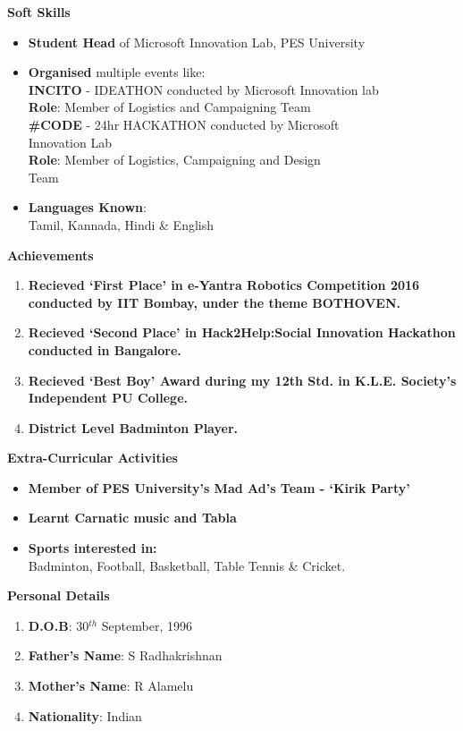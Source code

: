 \documentclass[a4paper,12pt,final]{memoir}
\newcommand{\Sep}{\vspace{1.5em}}
\newcommand{\SmallSep}{\vspace{0.5em}}
\newcommand\tab[1][1cm]{\hspace*{#1}}
\newcommand{\CVSection}[1]
{\Large\textbf{#1}\par
	\SmallSep\normalsize\normalfont}
\begin{document}
	\CVSection{Soft Skills}
		\begin{itemize}
			\item \textbf{Student Head} of Microsoft Innovation Lab, PES University
			\item \textbf{Organised} multiple events like:\\
			\tab \textbf{INCITO} - IDEATHON conducted by Microsoft Innovation lab\\
			\tab \tab \textbf{Role}: Member of Logistics and Campaigning Team\\
			\clearpage
			\framebreak
			\framebreak
			\tab \textbf{\#CODE} - 24hr HACKATHON conducted by Microsoft \\\tab \tab Innovation Lab\\
			\tab \tab \textbf{Role}: Member of Logistics, Campaigning and Design\\\tab \tab Team
			\item \textbf{Languages Known}:\\
			\tab Tamil, Kannada, Hindi \& English
			 
		\end{itemize}
	\Sep
	
	\CVSection{Achievements}
		\begin{enumerate}
			\item \textbf{Recieved `First Place' in e-Yantra Robotics Competition 2016 conducted by IIT Bombay, under the theme BOTHOVEN.}
			\item \textbf{Recieved `Second Place' in Hack2Help:Social Innovation Hackathon conducted in Bangalore.}
			\item \textbf{Recieved `Best Boy' Award during my 12th Std. in K.L.E. Society's Independent PU College.}
			\item \textbf{District Level Badminton Player.}
		\end{enumerate}
	\Sep
	
	\CVSection{Extra-Curricular Activities}
		\begin{itemize}
			\item \textbf{Member of PES University's Mad Ad's Team - `Kirik Party'}
			\item \textbf{Learnt Carnatic music and Tabla}
			\item \textbf{Sports interested in:}\\
			\tab Badminton, Football, Basketball, Table Tennis \& Cricket.
		\end{itemize}
	\Sep
	
	\CVSection{Personal Details}
		\begin{enumerate}
			\item \textbf{D.O.B}: 30$^{th}$ September, 1996
			\item \textbf{Father's Name}: S Radhakrishnan
			\item \textbf{Mother's Name}: R Alamelu
			\item \textbf{Nationality}: Indian
		\end{enumerate}
	\Sep
\end{document}
